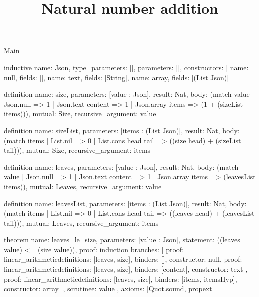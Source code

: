 \begin{lexlean}{Main}
\title{Natural number addition}
\begin{semanticmodule}
inductive{
  name: Json,
  type_parameters: [],
  parameters: [],
  constructors: [
    {name: null, fields: []},
    {name: text, fields: [String]},
    {name: array, fields: [(List Json)]}
  ]
}

definition{
  name: size,
  parameters: [value : Json],
  result: Nat,
  body: (match value
    | Json.null => 1
    | Json.text content => 1
    | Json.array items => (1 + (sizeList items))),
  mutual: Size,
  recursive_argument: value
}

definition{
  name: sizeList,
  parameters: [items : (List Json)],
  result: Nat,
  body: (match items | List.nil => 0 | List.cons head tail => ((size head) + (sizeList tail))),
  mutual: Size,
  recursive_argument: items
}

definition{
  name: leaves,
  parameters: [value : Json],
  result: Nat,
  body: (match value
    | Json.null => 1
    | Json.text content => 1
    | Json.array items => (leavesList items)),
  mutual: Leaves,
  recursive_argument: value
}

definition{
  name: leavesList,
  parameters: [items : (List Json)],
  result: Nat,
  body: (match items | List.nil => 0 | List.cons head tail => ((leaves head) + (leavesList tail))),
  mutual: Leaves,
  recursive_argument: items
}

theorem{
  name: leaves_le_size,
  parameters: [value : Json],
  statement: ((leaves value) <= (size value)),
  proof: induction{
    branches: [
      {proof: linear_arithmetic{definitions: [leaves, size]}, binders: [], constructor: null},
      {
        proof: linear_arithmetic{definitions: [leaves, size]},
        binders: [content],
        constructor: text
      },
      {proof: linear_arithmetic{definitions: [leaves, size]}, binders: [items, itemsHyp], constructor: array}
    ],
    scrutinee: value
  },
  axioms: [Quot.sound, propext]
}
\end{semanticmodule}
\end{lexlean}
